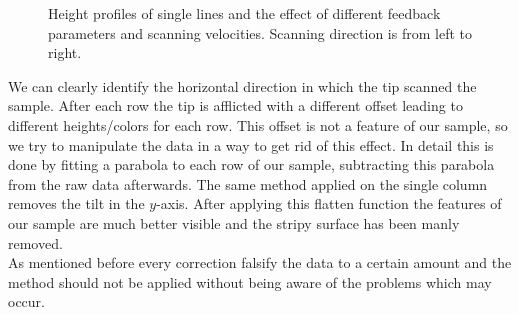 \documentclass[paper=a4,fontsize=10pt,DIV=18,twocolumn,parskip=half]{scrartcl}
\numberwithin{equation}{section}    %
\begin{document}
\begin{figure}
    \caption{Height profiles of single lines and the effect of different 
    feedback parameters and scanning velocities. Scanning direction is from left 
    to right.}
\end{figure}

We can clearly identify the horizontal direction in which the tip scanned the 
sample. After each row the tip is afflicted with a different offset leading to 
different heights/colors for each row. This offset is not a feature of our 
sample, so we try to manipulate the data in a way to get rid of this effect.
In detail this is done by fitting a parabola to each row of our sample, 
subtracting this parabola from the raw data afterwards. The same method applied 
on the single column removes the tilt in the $y$-axis. After applying this 
flatten function the features of our sample are much better visible and the 
stripy surface has been manly removed. \\
As mentioned before every correction falsify the data to a certain amount and 
the method should not be applied without being aware of the problems which may 
occur.
\end{document}
